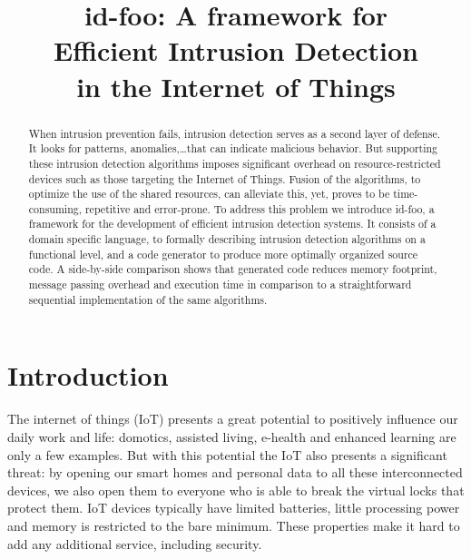 \documentclass[conference]{IEEEtran}
\newcommand{\NAME}{id-foo\xspace}
\begin{document}
\expandafter\def\csname PY@tok@err\endcsname{}

\title{
\NAME: A framework for \\
Efficient Intrusion Detection\\
in the Internet of Things
}

\author{%
}

\maketitle

\begin{abstract}

When intrusion prevention fails, intrusion detection serves as a second layer
of defense. It looks for patterns, anomalies,\dots that can indicate malicious
behavior. But supporting these intrusion detection algorithms imposes
significant overhead on resource-restricted devices such as those targeting the
Internet of Things. Fusion of the algorithms, to optimize the use of the shared
resources, can alleviate this, yet, proves to be time-consuming, repetitive and
error-prone. To address this problem we introduce \NAME, a framework for the
development of efficient intrusion detection systems. It consists of a domain
specific language, to formally describing intrusion detection algorithms on a
functional level, and a code generator to produce more optimally organized
source code. A side-by-side comparison shows that generated code reduces memory
footprint, message passing overhead and execution time in comparison to a
straightforward sequential implementation of the same algorithms.

\end{abstract}

\section{Introduction}



The internet of things (IoT) presents a great potential to positively influence
our daily work and life: domotics, assisted living, e-health and enhanced
learning are only a few examples\cite{atzori2010internet}. But with this
potential the IoT also presents a significant threat: by opening our smart
homes and personal data to all these interconnected devices, we also open them
to everyone who is able to break the virtual locks that protect them. IoT
devices typically have limited batteries, little processing power and memory is
restricted to the bare minimum. These properties make it hard to add any
additional service, including security.
\end{document}
